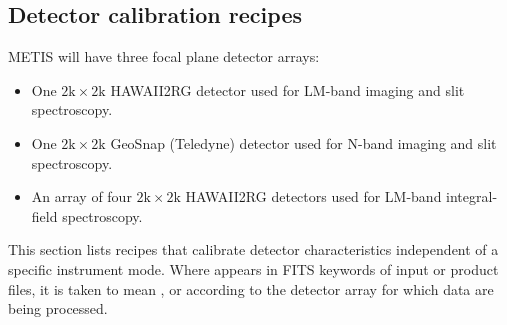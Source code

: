\subsection{Detector calibration recipes}
\label{Sec:detector_calibration}

METIS will have three focal plane detector arrays:
\begin{itemize}
\item One $2\mathrm{k}\times 2\mathrm{k}$ HAWAII2RG detector used for
  LM-band imaging and slit spectroscopy.
\item One $2\mathrm{k}\times 2\mathrm{k}$ GeoSnap (Teledyne) detector
  used for N-band imaging and slit spectroscopy.
\item An array of four $2\mathrm{k}\times 2\mathrm{k}$ HAWAII2RG
  detectors used for LM-band integral-field spectroscopy.
\end{itemize}
This section lists recipes that calibrate detector characteristics
independent of a specific instrument mode. Where  appears
in FITS keywords of input or product files, it is taken to mean
,  or  according to the detector
array for which data are being processed.


